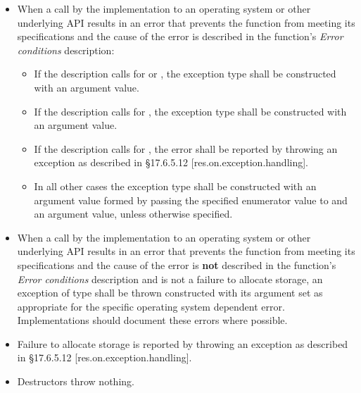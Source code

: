 \begin{itemize}
\item When a call by the implementation to an operating system or other underlying API results in an error that prevents the function from meeting its specifications and the cause of the error is described in the function's \textit{Error conditions} description:
	\begin{itemize}
		\item If the description calls for  or , the exception type shall be  constructed with an   argument value.
		\item If the description calls for , the exception type shall be  constructed with an   argument value.
		\item If the description calls for , the error shall be reported by throwing an exception as described in \CppXIV \S17.6.5.12 [res.on.exception.handling].
		\item In all other cases the exception type shall be  constructed with an  argument value formed by passing the specified enumerator value to  and an   argument value, unless otherwise specified.
	\end{itemize}

\item When a call by the implementation to an operating system or other underlying API results in an error that prevents the function from meeting its specifications and the cause of the error is \textbf{not} described in the function's \textit{Error conditions} description and is not a failure to allocate storage, an exception of type  shall be thrown constructed with its  argument set as appropriate for the specific operating system dependent error. Implementations should document these errors where possible.

\item Failure to allocate storage is reported by throwing an exception as described in \CppXIV \S17.6.5.12 [res.on.exception.handling].

\item Destructors throw nothing.
\end{itemize}

